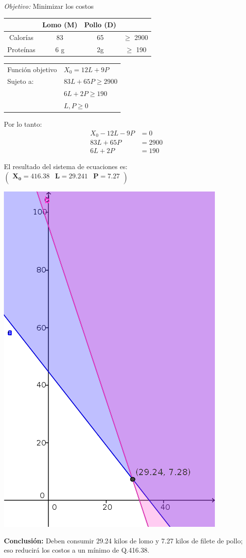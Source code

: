 \documentclass[11pt]{article}
\newcommand\conclusion{\vspace{.10in}\textbf{Conclusión: }}
\newcommand\obj{\vspace{.10in}\textit{Objetivo: }}
\begin{document}
\obj Minimizar los costos

\begin{tabular}{|c|c|c|c|}
\hline 
 & Lomo (M) & Pollo (D) &  \\ 
\hline 
Calorías & 83  & 65 & $\geq$ 2900 \\ 
\hline 
Proteínas & 6 g & 2g & $\geq$ 190 \\ 
\hline 
\end{tabular}

\begin{table}[h]
\begin{tabular}{ll}
Función objetivo & $X_0 = 12L+9P$    \\
Sujeto a:        & $83L + 65P \geq 2900$ \\
                 & $6L + 2P \geq 190$ \\
                 & $L,P \geq 0$    
\end{tabular}
\end{table}

Por lo tanto:
\begin{align*}
X_0 - 12L - 9P &= 0\\
83L + 65P &= 2900\\
6L + 2P &= 190
\end{align*}

El resultado del sistema de ecuaciones es:
\begin{math}
\mathbf{\left(\begin{array}{rrr}X_0=416.38&L=29.241&P=7.27\\
\end{array}\right)}
\end{math}

\begin{center}
\includegraphics[scale=0.4]{parcial1src/problema17.png}
\end{center}

\conclusion Deben consumir 29.24 kilos de lomo y 7.27 kilos de filete de pollo; eso reducirá los costos a un mínimo de Q.416.38.
\end{document}
